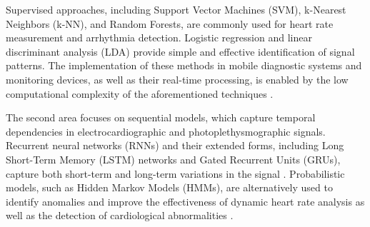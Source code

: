 \documentclass[journal]{IEEEtran}
\begin{document}
Supervised approaches, including Support Vector Machines (SVM), k-Nearest Neighbors (k-NN), and Random Forests, are commonly used for heart rate measurement and arrhythmia detection. Logistic regression and linear discriminant analysis (LDA) provide simple and effective identification of signal patterns. The implementation of these methods in mobile diagnostic systems and monitoring devices, as well as their real-time processing, is enabled by the low computational complexity of the aforementioned techniques \cite{11}.

The second area focuses on sequential models, which capture temporal dependencies in electrocardiographic and photoplethysmographic signals. Recurrent neural networks (RNNs) and their extended forms, including Long Short-Term Memory (LSTM) networks and Gated Recurrent Units (GRUs), capture both short-term and long-term variations in the signal \cite{12}. Probabilistic models, such as Hidden Markov Models (HMMs), are alternatively used to identify anomalies and improve the effectiveness of dynamic heart rate analysis as well as the detection of cardiological abnormalities \cite{13}.
\end{document}
